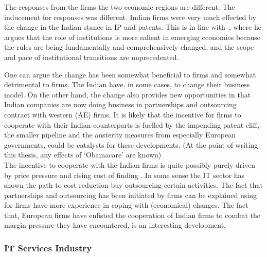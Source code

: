 The responses from the firms the two economic regions are different.
The inducement for responses was different.
Indian \pharma firms were very much effected by the change in the Indian stance in \gls{IP} and patents.
This is in line with~\cite{Peng:2003tt}, where he argues that the role of institutions is more salient in emerging economies because the rules are being fundamentally and comprehensively changed, and the scope and pace of institutional transitions are unprecedented.

One can argue the change has been somewhat beneficial to  firms and somewhat detrimental to  firms.
The Indian \pharmas have, in some cases, to change their business model.
On the other hand, the change also provides new opportunities in that Indian companies are now doing business in partnerships and outsourcing contract with western (AE) firms.
It is likely that the incentive for  \pharma firms to cooperate with their Indian counterparts is fuelled by the impending patent cliff, the smaller  pipeline and the austerity measures from especially European governments, could be catalysts for these developments.
(At the point of writing this thesis, any effects of `Obamacare' are known)\\
The incentive to cooperate with the Indian firms is quite possibly purely driven by price pressure and rising cost of finding .
In some sense the IT sector has shown the path to cost reduction buy outsourcing certain activities.
The fact that partnerships and outsourcing has been initiated by  firms can be explained using~\citep{Prahalad:2003th,Chittoor:2008cj,Newman:2000fc} for  firms have more experience in coping with (economical) changes.
The fact that, European \pharma firms have enlisted the cooperation of Indian firms to combat the margin pressure they have encountered, is an interesting development.
 
 
\subsubsection{IT Services Industry}

